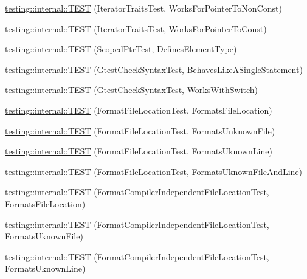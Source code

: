 \begin{DoxyCompactItemize}
\item 
\hyperlink{namespacetesting_1_1internal_a642234d85836450bb8795cf0a8a9f908}{testing\+::internal\+::\+T\+E\+ST} (Iterator\+Traits\+Test, Works\+For\+Pointer\+To\+Non\+Const)
\item 
\hyperlink{namespacetesting_1_1internal_afc0e95a0472d243967fd4720c681c478}{testing\+::internal\+::\+T\+E\+ST} (Iterator\+Traits\+Test, Works\+For\+Pointer\+To\+Const)
\item 
\hyperlink{namespacetesting_1_1internal_a99f56e2e9d5b30a879f877cc72bb0c0c}{testing\+::internal\+::\+T\+E\+ST} (Scoped\+Ptr\+Test, Defines\+Element\+Type)
\item 
\hyperlink{namespacetesting_1_1internal_a26d00130a017a66d0d60dc5a02a13d25}{testing\+::internal\+::\+T\+E\+ST} (Gtest\+Check\+Syntax\+Test, Behaves\+Like\+A\+Single\+Statement)
\item 
\hyperlink{namespacetesting_1_1internal_a4dfd147ff396984fca799878cb53dcea}{testing\+::internal\+::\+T\+E\+ST} (Gtest\+Check\+Syntax\+Test, Works\+With\+Switch)
\item 
\hyperlink{namespacetesting_1_1internal_a1a1c20d78e9e75b9c7f2b767eb62611b}{testing\+::internal\+::\+T\+E\+ST} (Format\+File\+Location\+Test, Formats\+File\+Location)
\item 
\hyperlink{namespacetesting_1_1internal_ace2f5407afdfb0767035d44b6758e4a0}{testing\+::internal\+::\+T\+E\+ST} (Format\+File\+Location\+Test, Formats\+Unknown\+File)
\item 
\hyperlink{namespacetesting_1_1internal_a17d1f472b6c1154de7b5b008b964ee32}{testing\+::internal\+::\+T\+E\+ST} (Format\+File\+Location\+Test, Formats\+Uknown\+Line)
\item 
\hyperlink{namespacetesting_1_1internal_a1195aaf7258c5442de7aebd95acefb9f}{testing\+::internal\+::\+T\+E\+ST} (Format\+File\+Location\+Test, Formats\+Uknown\+File\+And\+Line)
\item 
\hyperlink{namespacetesting_1_1internal_a9c12f8c1ebb19906e8fa0c430d139076}{testing\+::internal\+::\+T\+E\+ST} (Format\+Compiler\+Independent\+File\+Location\+Test, Formats\+File\+Location)
\item 
\hyperlink{namespacetesting_1_1internal_a65ad1cad17717c1b8ac4c2d4bef5e079}{testing\+::internal\+::\+T\+E\+ST} (Format\+Compiler\+Independent\+File\+Location\+Test, Formats\+Uknown\+File)
\item 
\hyperlink{namespacetesting_1_1internal_a0315a64a661f249628f2884080e0614f}{testing\+::internal\+::\+T\+E\+ST} (Format\+Compiler\+Independent\+File\+Location\+Test, Formats\+Uknown\+Line)

\end{DoxyCompactItemize}

